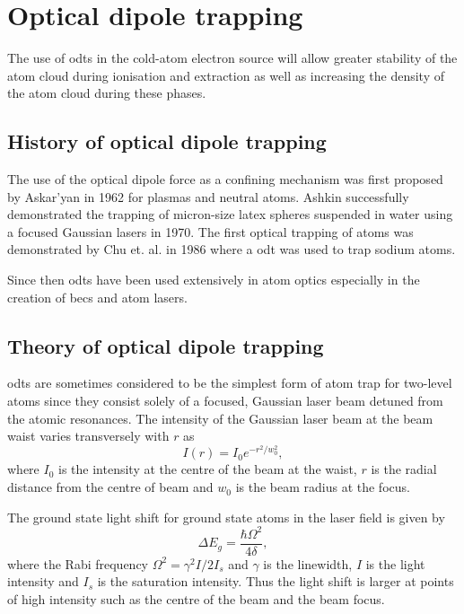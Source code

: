 \section{Optical dipole trapping}

The use of \glspl{odt} in the cold-atom electron source will allow greater stability of the atom cloud during ionisation and extraction as well as increasing the density of the atom cloud during these phases.

\subsection{History of optical dipole trapping}
The use of the optical dipole force as a confining mechanism was first proposed by Askar'yan in 1962\cite{askaryan_effects_1962} for plasmas and neutral atoms. Ashkin successfully demonstrated the trapping of micron-size latex spheres suspended in water using a focused Gaussian lasers in 1970\cite{ashkin_acceleration_1970}. The first optical trapping of atoms was demonstrated by Chu et. al. in 1986\cite{chu_experimental_1986} where a \gls{odt} was used to trap sodium atoms.

Since then \glspl{odt} have been used extensively in atom optics especially in the creation of \glspl{bec} and atom lasers.

\subsection{Theory of optical dipole trapping}
\Glspl{odt} are sometimes considered to be the simplest form of atom trap for two-level atoms since they consist solely of a focused, Gaussian laser beam detuned from the atomic resonances. The intensity of the Gaussian laser beam at the beam waist varies transversely with $r$ as
\begin{equation}
I(r) = I_0e^{-r^2 / w_0^2},
\end{equation}
where $I_0$ is the intensity at the centre of the beam at the waist, $r$ is the radial distance from the centre of beam and $w_0$ is the beam radius at the focus.

The ground state light shift for ground state atoms in the laser field is given by\cite{metcalf_laser_1999}
\begin{equation}
\Delta E_g = \frac{\hbar \Omega^2}{4\delta},
\end{equation}
where the Rabi frequency $\Omega^2= \gamma^2 I / 2 I_s$ and $\gamma$ is the linewidth, $I$ is the light intensity and $I_s$ is the saturation intensity. Thus the light shift is larger at points of high intensity such as the centre of the beam and the beam focus.

